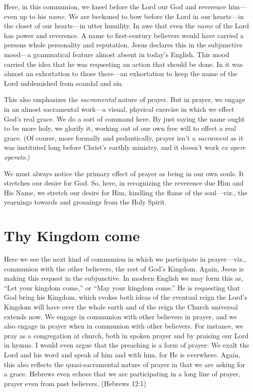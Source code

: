 \documentclass[12pt]{article}
\begin{document}
Here, in this communion, we kneel before the Lord our God and reverence him---even up to his \emph{name.}  We are beckoned to bow before the Lord in our hearts---in the closet of our hearts---in utter humility.  In awe that even the \emph{name} of the Lord has power and reverence.  A name to first-century believers would have carried a persons whole personality and reputation.  Jesus declares this in the subjunctive mood---a grammatical feature almost absent in today's English.  This mood carried the idea that he was requesting an action that should be done.  In it was almost an exhortation to those there---an exhortation to keep the name of the Lord unblemished from scandal and sin.

This also emphasizes the \emph{sacramental} nature of prayer.  But in prayer, we engage in an almost sacramental work---a visual, physical exercise in which we effect God's real grace.  We do a sort of command here.  By just saying the name ought to be more holy, we glorify it, working out of our own free will to effect a real grace.  (Of course, more formally and pedantically, prayer isn't a \emph{sacrament} as it was instituted long before Christ's earthly ministry, and it doesn't work \emph{ex opere operato}.)

We must always notice the primary effect of prayer as being in our own souls.  It stretches our desire for God. So, here, in recognizing the reverence due Him and His Name, we stretch our desire for Him, kindling the flame of the soul---viz., the yearnings towards and groanings from the Holy Spirit.

\section{Thy Kingdom come}
\label{sec-5}
Here we see the next kind of communion in which we participate in prayer---viz., communion with the other believers, the rest of God's Kingdom.  Again, Jesus is making this request in the subjunctive.  In modern English we may form this as, ``Let your kingdom come,'' or ``May your kingdom come.''  He is requesting that God bring his Kingdom, which evokes both ideas of the eventual reign the Lord's Kingdom will have over the whole earth and of the reign the Church universal extends now.  We engage in communion with other believers in prayer, and we also engage in prayer when in communion with other believers.  For instance, we pray as a congregation at church, both in spoken prayer and by praising our Lord in hymns.  I would even argue that the preaching is a form of prayer: We exalt the Lord and his word and speak of him and with him, for He is everwhere.  Again, this also reflects the quasi-sacramental nature of prayer in that we are asking for a grace.  Hebrews even echoes that we are participating in a long line of prayer, prayer even from past believers.  (Hebrews 12:1)
\end{document}

